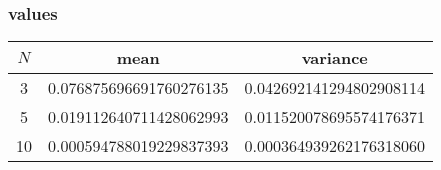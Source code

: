 \subsubsection{values}
\begin{table}[H]
\centering
\begin{tabular}{c|c|c}
$N$ & mean & variance \\ \hline
3  & 0.076875696691760276135 & 0.042692141294802908114\\
5  & 0.019112640711428062993 & 0.011520078695574176371\\
10 & 0.000594788019229837393 & 0.000364939262176318060\\
\end{tabular}
\end{table}

